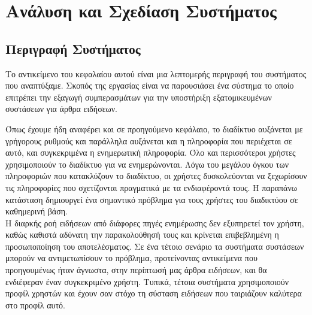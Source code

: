 \chapter{Ανάλυση και Σχεδίαση Συστήματος}

\section{Περιγραφή Συστήματος}

Το αντικείμενο του κεφαλαίου αυτού είναι μια λεπτομερής περιγραφή του συστήματος που αναπτύξαμε.
Σκοπός της εργασίας είναι να παρουσιάσει ένα σύστημα το οποίο 
επιτρέπει την εξαγωγή συμπερασμάτων για την υποστήριξη εξατομικευμένων συστάσεων για άρθρα ειδήσεων. 

Όπως έχουμε ήδη αναφέρει και σε προηγούμενο κεφάλαιο, το διαδίκτυο αυξάνεται με
γρήγορους ρυθμούς και παράλληλα αυξάνεται και η πληροφορία που περιέχεται σε αυτό, 
και συγκεκριμένα η ενημερωτική πληροφορία. Όλο και περισσότεροι χρήστες
χρησιμοποιούν το διαδίκτυο για να ενημερώνονται. Λόγω του μεγάλου όγκου των
πληροφοριών που κατακλύζουν το διαδίκτυο, οι χρήστες δυσκολεύονται να ξεχωρίσουν
τις πληροφορίες που σχετίζονται πραγματικά με τα ενδιαφέροντά τους. 
Η παραπάνω κατάσταση δημιουργεί ένα σημαντικό πρόβλημα για τους χρήστες του διαδικτύου σε
καθημερινή βάση.\\
Η διαρκής ροή ειδήσεων από διάφορες πηγές ενημέρωσης δεν εξυπηρετεί τον χρήστη,
καθώς καθιστά αδύνατη την παρακολούθησή τους και κρίνεται επιβεβλημένη η
προσωποποίηση του αποτελέσματος. Σε ένα τέτοιο σενάριο τα συστήματα συστάσεων
μπορούν να αντιμετωπίσουν το πρόβλημα, προτείνοντας αντικείμενα που
προηγουμένως ήταν άγνωστα, στην περίπτωσή μας άρθρα ειδήσεων, και θα
ενδιέφεραν έναν συγκεκριμένο χρήστη. Τυπικά, τέτοια συστήματα χρησιμοποιούν
προφίλ χρηστών και έχουν σαν στόχο τη σύσταση ειδήσεων που ταιριάζουν καλύτερα
στο προφίλ αυτό.\\

